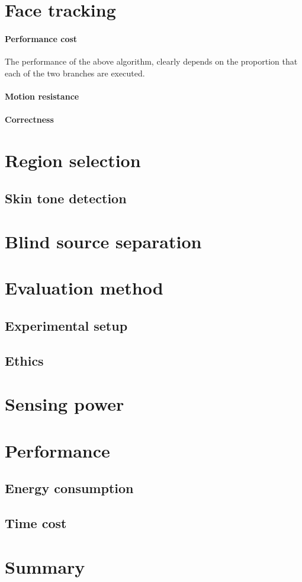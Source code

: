 \section{Face tracking}
\label{section:face_tracking}
\paragraph{Performance cost}
The performance of the above algorithm, clearly depends on the proportion that each of the two branches are executed.
\paragraph{Motion resistance}

\paragraph{Correctness}

\section{Region selection}
\label{section:region_selection}

\subsection{Skin tone detection}
\label{section:skin_tone_detection}

\section{Blind source separation}

\section{Evaluation method}
\subsection{Experimental setup}
\subsection{Ethics}

\section{Sensing power}
\section{Performance}
\subsection{Energy consumption}
\subsection{Time cost}
\section{Summary}